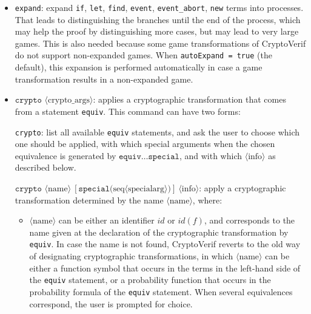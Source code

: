 \documentclass{article}
\newcommand{\nonterm}[1]{\langle\textrm{#1}\rangle}
\newcommand{\seq}[1]{\textrm{seq}\nonterm{#1}}
\begin{document}
\begin{itemize}
\item \texttt{expand}: expand \texttt{if}, \texttt{let}, \texttt{find},
\texttt{event}, \texttt{event\_abort}, \texttt{new} terms into processes.
That leads to distinguishing the branches until the end of the process,
which may help the proof by distinguishing more cases, but
may lead to very large games.
This is also needed because some game transformations of CryptoVerif
do not support non-expanded games.
When \texttt{autoExpand = true} (the default), this expansion
is performed automatically in case a game transformation results
in a non-expanded game. 

\item $\texttt{crypto }\nonterm{crypto\_args}$: applies a cryptographic transformation
that comes from a statement \texttt{equiv}. This command can
have two forms:

\texttt{crypto}: list all available \texttt{equiv} statements,
and ask the user to choose which one should be applied, 
with which special arguments when the chosen equivalence is generated by 
$\texttt{equiv} \dots \texttt{special}$,
and with which $\nonterm{info}$ as described below.

$\texttt{crypto }\nonterm{name}\ [\texttt{special(}\seq{specialarg}\texttt{)}]\ \nonterm{info}$: 
apply a cryptographic transformation determined by the name $\nonterm{name}$, where: 
\begin{itemize}
\item $\nonterm{name}$ can be either an identifier $\mathit{id}$ or $\mathit{id}(f)$, 
and corresponds to the name given at the declaration of the 
cryptographic transformation by \texttt{equiv}.
In case the name is not found, CryptoVerif reverts to the
old way of designating cryptographic transformations, in which
$\nonterm{name}$ can be either a
function symbol that occurs in the terms in the left-hand side of the
\texttt{equiv} statement, or a probability function that occurs in the
probability formula of the \texttt{equiv} statement.
When several equivalences correspond, the user is prompted for choice.


\end{itemize}
\end{itemize}
\end{document}
